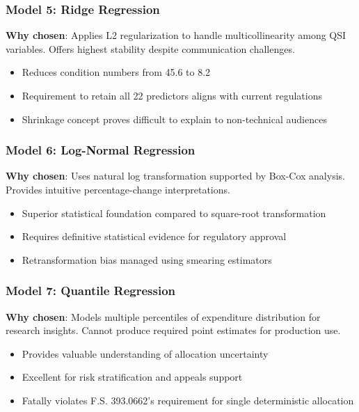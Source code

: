 \subsubsection{Model 5: Ridge Regression}
\textbf{Why chosen}: Applies L2 regularization to handle multicollinearity among QSI variables. Offers highest stability despite communication challenges.
\begin{itemize}
    \item Reduces condition numbers from 45.6 to 8.2
    \item Requirement to retain all 22 predictors aligns with current regulations
    \item Shrinkage concept proves difficult to explain to non-technical audiences
\end{itemize}

\subsubsection{Model 6: Log-Normal Regression}
\textbf{Why chosen}: Uses natural log transformation supported by Box-Cox analysis. Provides intuitive percentage-change interpretations.
\begin{itemize}
    \item Superior statistical foundation compared to square-root transformation
    \item Requires definitive statistical evidence for regulatory approval
    \item Retransformation bias managed using smearing estimators
\end{itemize}

\subsubsection{Model 7: Quantile Regression}
\textbf{Why chosen}: Models multiple percentiles of expenditure distribution for research insights. Cannot produce required point estimates for production use.
\begin{itemize}
    \item Provides valuable understanding of allocation uncertainty
    \item Excellent for risk stratification and appeals support
    \item Fatally violates F.S. 393.0662's requirement for single deterministic allocation
\end{itemize}

